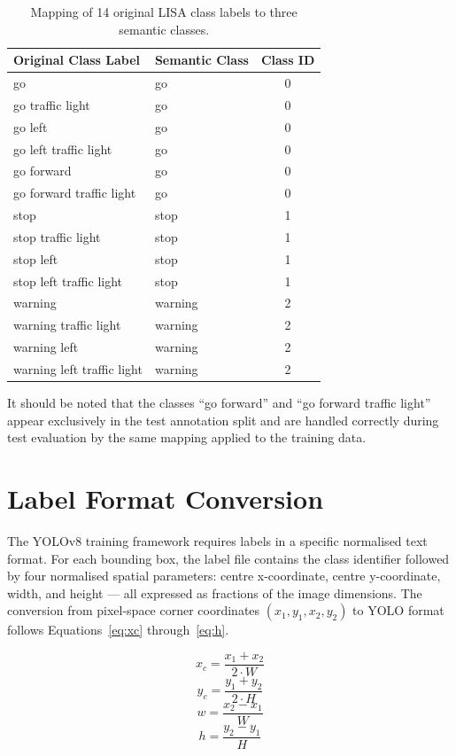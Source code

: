 \begin{table}[htbp]
\caption{Mapping of 14 original LISA class labels to three semantic classes.}
\label{tb:classmap}
\centering
\small
\begin{tabular}{>{\raggedright\arraybackslash}p{} l c}
\toprule
\textbf{Original Class Label} & \textbf{Semantic Class} & \textbf{Class ID} \\
\midrule
go & go & 0 \\
go traffic light & go & 0 \\
go left & go & 0 \\
go left traffic light & go & 0 \\
go forward & go & 0 \\
go forward traffic light & go & 0 \\
stop & stop & 1 \\
stop traffic light & stop & 1 \\
stop left & stop & 1 \\
stop left traffic light & stop & 1 \\
warning & warning & 2 \\
warning traffic light & warning & 2 \\
warning left & warning & 2 \\
warning left traffic light & warning & 2 \\
\bottomrule
\end{tabular}
\end{table}

It should be noted that the classes ``go forward'' and ``go forward traffic light'' appear exclusively in the test annotation split and are handled correctly during test evaluation by the same mapping applied to the training data.

\section{Label Format Conversion}

The YOLOv8 training framework requires labels in a specific normalised text format. For each bounding box, the label file contains the class identifier followed by four normalised spatial parameters: centre x-coordinate, centre y-coordinate, width, and height --- all expressed as fractions of the image dimensions. The conversion from pixel-space corner coordinates $(x_1, y_1, x_2, y_2)$ to YOLO format follows Equations~\ref{eq:xc} through~\ref{eq:h}.

\begin{equation}
x_c = \frac{x_1 + x_2}{2 \cdot W}
\label{eq:xc}
\end{equation}
\begin{equation}
y_c = \frac{y_1 + y_2}{2 \cdot H}
\label{eq:yc}
\end{equation}
\begin{equation}
w = \frac{x_2 - x_1}{W}
\label{eq:w}
\end{equation}
\begin{equation}
h = \frac{y_2 - y_1}{H}
\label{eq:h}
\end{equation}

